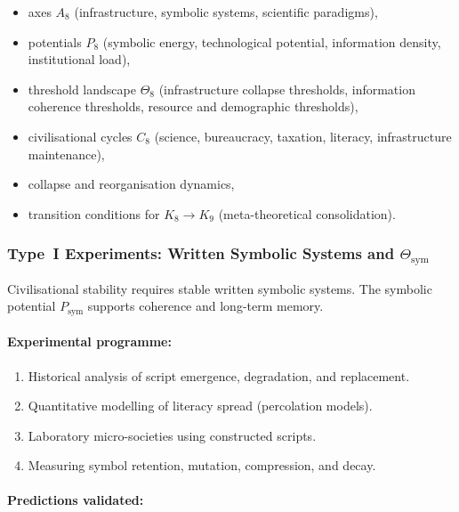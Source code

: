 \begin{itemize}
    \item axes $A_8$ (infrastructure, symbolic systems, scientific paradigms),
    \item potentials $P_8$ (symbolic energy, technological potential, 
          information density, institutional load),
    \item threshold landscape $\Theta_8$ (infrastructure collapse thresholds,
          information coherence thresholds, resource and demographic thresholds),
    \item civilisational cycles $C_8$ (science, bureaucracy, taxation, 
          literacy, infrastructure maintenance),
    \item collapse and reorganisation dynamics,
    \item transition conditions for $K_8 \to K_9$ (meta-theoretical consolidation).
\end{itemize}



\subsubsection{Type~I Experiments: Written Symbolic Systems and $\Theta_{\mathrm{sym}}$}

Civilisational stability requires stable written symbolic systems.
The symbolic potential $P_{\mathrm{sym}}$ supports coherence and long-term memory.

\paragraph{Experimental programme:}

\begin{enumerate}
    \item Historical analysis of script emergence, degradation, and replacement.
    \item Quantitative modelling of literacy spread (percolation models).
    \item Laboratory micro-societies using constructed scripts.
    \item Measuring symbol retention, mutation, compression, and decay.
\end{enumerate}

\paragraph{Predictions validated:}

